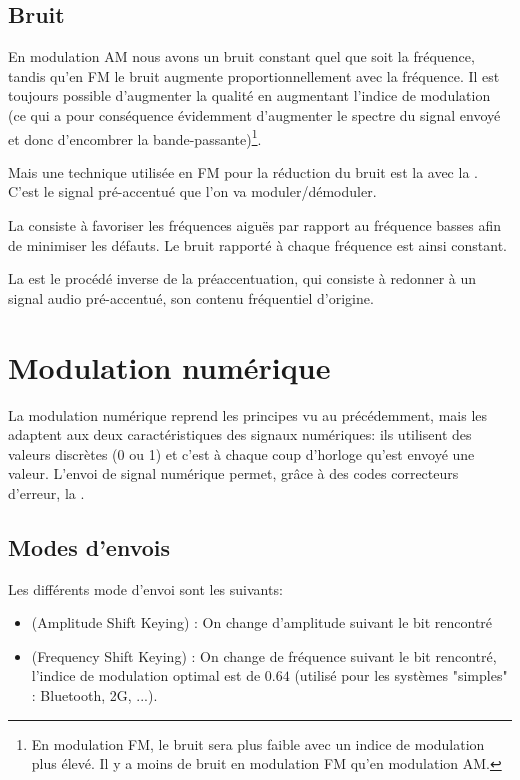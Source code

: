 \subsection{Bruit}

En modulation AM nous avons un bruit constant quel que soit la fréquence, tandis qu'en FM le bruit augmente proportionnellement avec la fréquence. Il est toujours possible d'augmenter la qualité en augmentant l'indice de modulation (ce qui a pour conséquence évidemment d'augmenter le spectre du signal envoyé et donc d'encombrer la bande-passante)\footnote{En modulation FM, le bruit sera plus faible avec un indice de modulation plus élevé. Il y a moins de bruit en modulation FM qu'en modulation AM.}.

Mais une technique utilisée en FM pour la réduction du bruit est la  avec la . C'est le signal pré-accentué que l'on va moduler/démoduler.

La  consiste à favoriser les fréquences aiguës par rapport au fréquence basses afin de minimiser les défauts. Le bruit rapporté à chaque fréquence est ainsi constant.

La est le procédé inverse de la préaccentuation, qui consiste à redonner à un signal audio pré-accentué, son contenu fréquentiel d'origine.

\section{Modulation numérique}

La modulation numérique reprend les principes vu au précédemment, mais les adaptent aux deux caractéristiques des signaux numériques: ils utilisent des valeurs discrètes (0 ou 1) et c'est à chaque coup d'horloge qu'est envoyé une valeur. L'envoi de signal numérique permet, grâce à des codes correcteurs d'erreur, la .

\subsection{Modes d'envois}

Les différents mode d'envoi sont les suivants:
\begin{itemize}
	\item {} (Amplitude Shift Keying) : On change d'amplitude suivant le bit rencontré
	\item {} (Frequency Shift Keying) : On change de fréquence suivant le bit rencontré, l'indice de modulation optimal est de $0.64$ (utilisé pour les systèmes "simples" : Bluetooth, 2G, ...).
\end{itemize}

